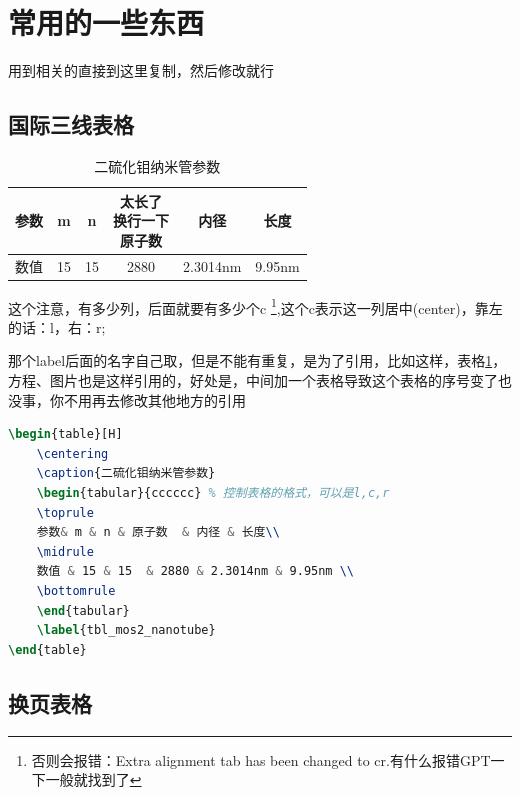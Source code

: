 \documentclass[AutoFakeBold]{LUTThesis}
\begin{document}
\section{常用的一些东西} %
\label{sec:常用的一些东西}

用到相关的直接到这里复制，然后修改就行

\subsection{国际三线表格} %
\label{sub:国际三线表格}

\begin{table}[H]
    \centering
    \caption{二硫化钼纳米管参数}
    \begin{tabular}{cccccc} %
        \toprule
        参数 & m  & n  & \tabincell{c}{太长了                     \\换行一下\\原子数}  & 内径 & 长度\\
        \midrule
        数值 & 15 & 15 & 2880              & 2.3014nm & 9.95nm \\
        \bottomrule
    \end{tabular}
    \label{tbl_mos2_nanotube}
\end{table}

这个注意，有多少列，后面就要有多少个c \footnote{否则会报错：Extra alignment tab has been changed to cr.有什么报错GPT一下一般就找到了},这个c表示这一列居中(center)，靠左的话：l，右：r;

那个label后面的名字自己取，但是不能有重复，是为了引用，比如这样，表格\ref{tbl_mos2_nanotube}，方程、图片也是这样引用的，好处是，中间加一个表格导致这个表格的序号变了也没事，你不用再去修改其他地方的引用

\begin{lstlisting}[language = tex]
\begin{table}[H]
    \centering
    \caption{二硫化钼纳米管参数}
    \begin{tabular}{cccccc} % 控制表格的格式，可以是l,c,r
    \toprule
    参数& m & n & 原子数  & 内径 & 长度\\
    \midrule
    数值 & 15 & 15  & 2880 & 2.3014nm & 9.95nm \\
    \bottomrule
    \end{tabular}
    \label{tbl_mos2_nanotube}
\end{table}
\end{lstlisting}

\subsection{换页表格} %
\end{document}
